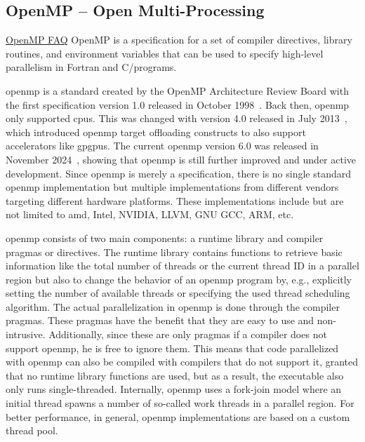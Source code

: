 \subsection{OpenMP -- Open Multi-Processing}
\label{sec:frameworks:openmp}

\begin{quotebox}{\href{https://www.openmp.org/about/openmp-faq/\#WhatIs}{OpenMP FAQ}}
OpenMP is a specification for a set of compiler directives, library routines, and environment variables that can be used to specify high-level parallelism in Fortran and C/\cpp programs.
\end{quotebox}

\acrfull{openmp} is a standard created by the OpenMP Architecture Review Board with the first specification version 1.0 released in October 1998~\cite{openmp_architecture_review_board_openmp_1998}. 
Back then, \gls{openmp} only supported \glspl{cpu}. 
This was changed with version 4.0 released in July 2013~\cite{openmp_architecture_review_board_openmp_2013}, which introduced \gls{openmp} target offloading constructs to also support accelerators like \glspl{gpgpu}. 
The current \gls{openmp} version 6.0 was released in November 2024~\cite{openmp_architecture_review_board_openmp_2024}, showing that \gls{openmp} is still further improved and under active development. 
Since \gls{openmp} is merely a specification, there is no single standard \gls{openmp} implementation but multiple implementations from different vendors targeting different hardware platforms. 
These implementations include but are not limited to \gls{amd}, Intel, NVIDIA, LLVM, GNU GCC, ARM, etc. 

\gls{openmp} consists of two main components: a runtime library and compiler pragmas or directives. 
The runtime library contains functions to retrieve basic information like the total number of threads or the current thread ID in a parallel region but also to change the behavior of an \gls{openmp} program by, e.g., explicitly setting the number of available threads or specifying the used thread scheduling algorithm. 
The actual parallelization in \gls{openmp} is done through the compiler pragmas. 
These pragmas have the benefit that they are easy to use and non-intrusive. 
Additionally, since these are only pragmas if a compiler does not support \gls{openmp}, he is free to ignore them. 
This means that code parallelized with \gls{openmp} can also be compiled with compilers that do not support it, granted that no runtime library functions are used, but as a result, the executable also only runs single-threaded. 
Internally, \gls{openmp} uses a fork-join model where an initial thread spawns a number of so-called work threads in a parallel region. 
For better performance, in general, \gls{openmp} implementations are based on a custom thread pool. 

